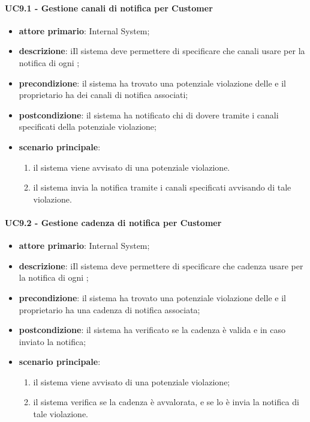 \paragraph{UC9.1 -  Gestione canali di notifica per Customer}
\begin{itemize}
	\item \textbf{attore primario}: Internal System;
	\item \textbf{descrizione}: iIl sistema deve permettere di specificare che canali usare per la notifica di ogni ; 
	\item \textbf{precondizione}: il sistema ha trovato una potenziale violazione delle  e il  proprietario ha dei canali di notifica associati;
	\item \textbf{postcondizione}: il sistema ha notificato chi di dovere tramite i canali specificati della potenziale violazione;
	\item \textbf{scenario principale}: 
	\begin{enumerate}
		\item il sistema viene avvisato di una potenziale violazione.
		\item il sistema invia la notifica tramite i canali specificati avvisando di tale violazione.
	\end{enumerate}
\end{itemize}
\paragraph{UC9.2 -  Gestione cadenza di notifica per Customer}
\begin{itemize}
	\item \textbf{attore primario}: Internal System;
	\item \textbf{descrizione}: iIl sistema deve permettere di specificare che cadenza usare per la notifica di ogni ; 
	\item \textbf{precondizione}: il sistema ha trovato una potenziale violazione delle  e il  proprietario ha una cadenza di notifica associata;
	\item \textbf{postcondizione}: il sistema ha verificato se la cadenza è valida e in caso inviato la notifica;
	\item \textbf{scenario principale}: 
	\begin{enumerate}
		\item il sistema viene avvisato di una potenziale violazione;
		\item il sistema verifica se la cadenza è avvalorata, e se lo è invia la notifica di tale violazione.
	\end{enumerate}
\end{itemize}

